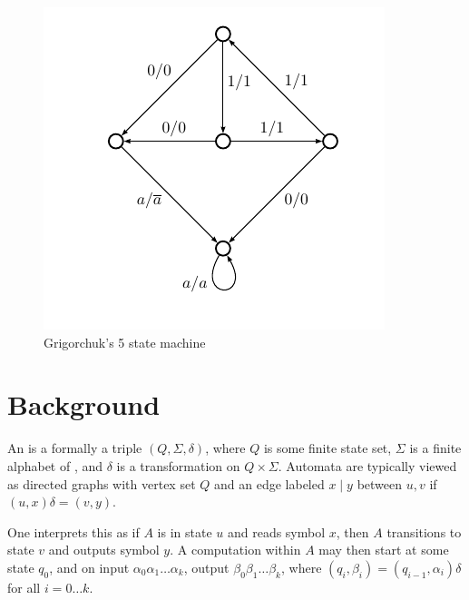 \documentclass[11pt]{article}
\begin{document}
\begin{figure}
\begin{center}
\includegraphics[scale=0.5]{figures/grigorchuk}
\end{center}
\caption{Grigorchuk's 5 state machine}
\end{figure}
\section{Background}
An  is a formally a triple $(Q, \Sigma, \delta)$,
where $Q$ is some finite state set, $\Sigma$ is a finite alphabet of
, and $\delta$ is a transformation on $Q \times \Sigma$.
Automata are typically viewed as directed graphs with vertex set $Q$
and an edge labeled $x \mid y$ between $u, v$ if $(u, x)\delta = (v, y)$.

\begin{center}
\end{center}

One interprets this as if $A$ is in state $u$ and reads symbol $x$,
then $A$ transitions to state $v$ and outputs symbol $y$. A
computation within $A$ may then start at some state $q_0$, and on
input $\alpha_0 \alpha_1 \ldots \alpha_k$, output
$\beta_0 \beta_1 \ldots \beta_k$, where
$(q_i, \beta_i) = (q_{i-1}, \alpha_i)\delta$ for all $i = 0\ldots k$.
\end{document}
